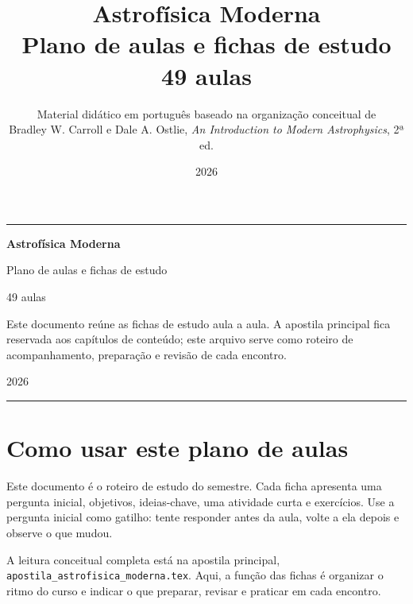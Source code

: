\documentclass[11pt,a4paper]{article}
\title{\textbf{Astrofísica Moderna}\\Plano de aulas e fichas de estudo\\49 aulas}
\author{Material didático em português baseado na organização conceitual de\\Bradley W. Carroll e Dale A. Ostlie, \textit{An Introduction to Modern Astrophysics}, 2ª ed.}
\date{2026}
\begin{document}
\begin{titlepage}
\thispagestyle{empty}
\vspace*{0.8cm}
{\color{astroGold}\rule{\textwidth}{1.2pt}}\par
\vspace{1.0cm}
{\fontsize{32}{36}\selectfont\bfseries\color{astroNavy} Astrofísica Moderna\par}
\vspace{0.35cm}
{\Large\color{astroBlue} Plano de aulas e fichas de estudo\par}
{\large\color{astroMuted} 49 aulas\par}
\vfill
\begin{noticebox}
Este documento reúne as fichas de estudo aula a aula. A apostila principal fica reservada aos capítulos de conteúdo; este arquivo serve como roteiro de acompanhamento, preparação e revisão de cada encontro.
\end{noticebox}
\vfill
{\color{astroMuted}2026\par}
\vspace{0.6cm}
{\color{astroGold}\rule{0.38\textwidth}{1.2pt}}\par
\end{titlepage}

\tableofcontents
\newpage
{}

\section*{Como usar este plano de aulas}
Este documento é o roteiro de estudo do semestre. Cada ficha apresenta uma pergunta inicial, objetivos, ideias-chave, uma atividade curta e exercícios. Use a pergunta inicial como gatilho: tente responder antes da aula, volte a ela depois e observe o que mudou.

A leitura conceitual completa está na apostila principal, \texttt{apostila\_astrofisica\_moderna.tex}. Aqui, a função das fichas é organizar o ritmo do curso e indicar o que preparar, revisar e praticar em cada encontro.
\end{document}
